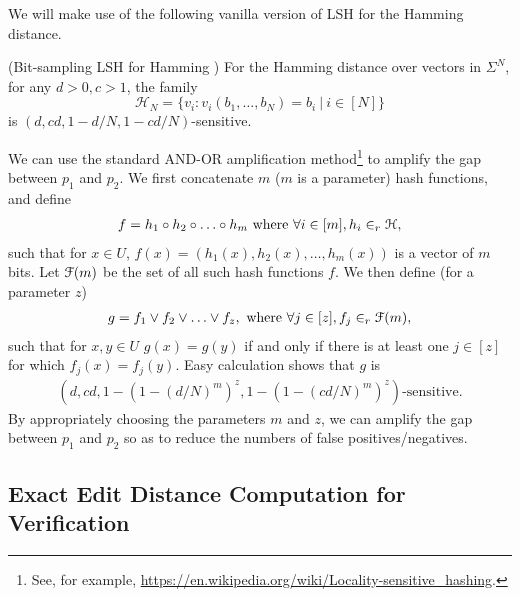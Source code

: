 We will make use of the following vanilla version of LSH for the Hamming distance.
\begin{theorem}(Bit-sampling LSH for Hamming  \cite{GIM99})
For the Hamming distance over vectors in $\Sigma^N$, for any $d > 0, c > 1$, the family $$\mathcal{H}_N = \{v_i: v_i(b_1, \dots, b_N) = b_i\ |\ i \in [N]\}$$ is  $(d, cd, 1-{d}/{N}, 1-{cd}/{N})$-sensitive.
\end{theorem}

We can use the standard AND-OR amplification method\footnote{See, for example, \url{https://en.wikipedia.org/wiki/Locality-sensitive_hashing}.} to amplify the gap between $p_1$ and $p_2$.
We first concatenate $m$ ($m$ is a parameter) hash functions, and define 
\begin{eqnarray*}
f = h_1 \circ h_2 \circ \ldots \circ h_m \text{ where } \forall i \in [m], h_i \in_r \mathcal{H},
\end{eqnarray*}
such that for $x \in U$, $f(x) = (h_1(x), h_2(x), \ldots, h_m(x))$ is a vector of $m$ bits.  Let $\mathcal{F}(m)$ be the set of all such hash functions $f$.
We then define (for a parameter $z$)
\begin{eqnarray*}
g = f_1 \vee f_2 \vee \ldots \vee f_z, \text{ where } \forall j \in [z], f_j \in_r \mathcal{F}(m),
\end{eqnarray*}
such that for $x, y \in U$ $g(x) = g(y)$ if and only if there is at least one $j \in [z]$ for which $f_j(x) = f_j(y)$.  Easy calculation shows that $g$ is
\begin{eqnarray*}
\left(d, cd, 1 - \left(1 - \left({d}/{N}\right)^m\right)^z, 1 - \left(1 - \left( {cd}/{N} \right)^m \right)^z \right) \text{-sensitive.}
\end{eqnarray*}
 By appropriately choosing the parameters $m$ and $z$,  we can amplify the gap between $p_1$ and $p_2$ so as to reduce the numbers of false positives/negatives.  


\subsection{Exact Edit Distance Computation for Verification}
\label{sec:exact-ED}

